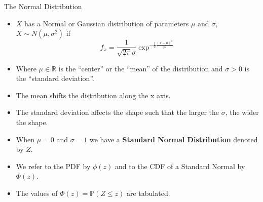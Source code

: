\documentclass[handout]{beamer}
\begin{document}
\begin{frame}{The Normal Distribution}

\scriptsize{
\begin{itemize}
 \item $X$ has a Normal or Gaussian distribution of parameters $\mu$ and $\sigma$, $X \sim N(\mu,\sigma^2)$ if  
 \begin{displaymath}
 f_x=\frac{1}{\sqrt{2\pi}\sigma}\exp^{-\frac{1}{2}\frac{(x-\mu)^2}{\sigma^{2}}} 
 \end{displaymath}
 \item Where $\mu \in \mathbb{R}$ is the ``center'' or the ``mean'' of the distribution and $\sigma > 0$ is the ``standard deviation''.
 \item The mean shifts the distribution along the x axis. 
 \item The standard deviation affects the shape such that the larger the $\sigma$, the wider the shape.
 
 \item When $\mu = 0$ and $\sigma =1$ we have a \textbf{Standard Normal Distribution} denoted by $Z$.
 \item We refer to the PDF by $\phi(z)$ and to the CDF of a Standard Normal by $\Phi(z)$.
 
 \item The values of $\Phi(z)= \mathbb{P}(Z \leq z)$ are tabulated.
 
    
 \end{itemize}
}
\end{frame}
\end{document}
